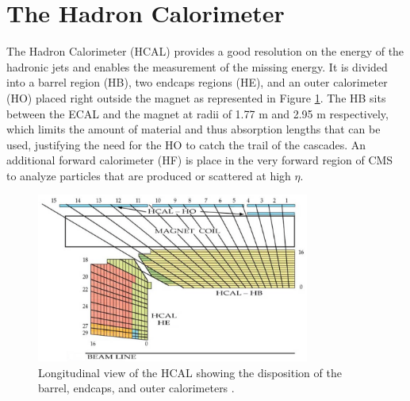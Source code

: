   \section{The Hadron Calorimeter}

    The Hadron Calorimeter (HCAL) provides a good resolution on the energy of the hadronic jets and enables the measurement of the missing energy. It is divided into a barrel region (HB), two endcaps regions (HE), and an outer calorimeter (HO) placed right outside the magnet as represented in Figure \ref{fig:I-3-hcal}. The HB sits between the ECAL and the magnet at radii of 1.77 m and 2.95 m respectively, which limits the amount of material and thus absorption lengths that can be used, justifying the need for the HO to catch the trail of the cascades. An additional forward calorimeter (HF) is place in the very forward region of CMS to analyze particles that are produced or scattered at high $ \eta $. \\

    \begin{figure}[h!]
      \centering
      \includegraphics[width=0.8\textwidth]{img/I-3-cms/hcal.png}
      \caption{Longitudinal view of the HCAL showing the disposition of the barrel, endcaps, and outer calorimeters \cite{1748-0221-3-08-S08004}.}
      \label{fig:I-3-hcal}
    \end{figure}

